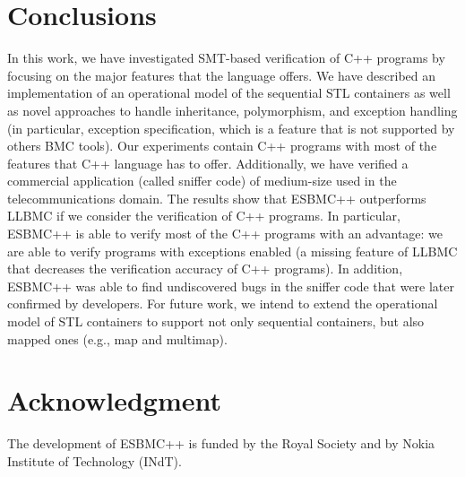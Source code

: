 \documentclass[conference]{IEEEtran}
\begin{document}

\section{Conclusions}
\label{conclusions}

In this work, we have investigated SMT-based verification of C++ programs
by focusing on the major features that the language offers. We have described
an implementation of an operational model of the sequential STL containers
as well as novel approaches to handle inheritance, polymorphism, and exception handling
(in particular, exception specification, which is a feature that is not supported by others
BMC tools). Our experiments contain C++ programs with most of the features that C++ language
has to offer. Additionally, we have verified a commercial application (called sniffer code) of medium-size
used in the telecommunications domain. The results show that ESBMC++ outperforms LLBMC if we
consider the verification of C++ programs. In particular, ESBMC++ is able to verify most of the
C++ programs with an advantage: we are able to verify programs
with exceptions enabled (a missing feature of LLBMC that decreases the verification accuracy of
C++ programs). In addition, ESBMC++ was able to find undiscovered bugs in the sniffer code that
were later confirmed by developers. For future work, we intend to extend the operational model of STL containers
to support not only sequential containers, but also mapped ones (e.g., map and multimap).




\section*{Acknowledgment}
The development of ESBMC++ is funded by the Royal Society and by Nokia Institute of Technology (INdT).

\end{document}
